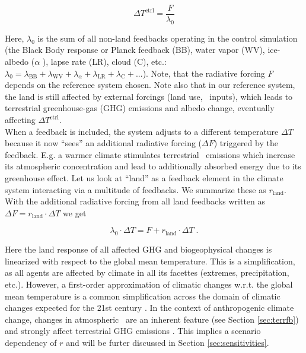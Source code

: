  \begin{equation}
   \Delta T^{\text{ctrl}} = \frac{F}{\lambda_0}
 \label{eqn:fb0}
 \end{equation}

Here, $\lambda_0$ is the sum of all non-land feedbacks operating in the control simulation (the Black Body response or Planck feedback (BB), water vapor (WV), ice-albedo ($\alpha$ ), lapse rate (LR), cloud (C), etc.: $\lambda_0 = \lambda_{\text{BB}} + \lambda_{\text{WV}} + \lambda_\alpha + \lambda_{\text{LR}} + \lambda_{\text{C}} + ... $). Note, that the radiative forcing $F$ depends on the reference system chosen. Note also that in our reference system, the land is still affected by external forcings (land use, \nr\ inputs), which leads to terrestrial greenhouse-gas (GHG) emissions and albedo change, eventually affecting $\Delta T^{\text{ctrl}}$.\\

 When a feedback is included, the system adjusts to a different temperature $\Delta T$ because it now ``sees'' an additional radiative forcing ($\Delta F$) triggered by the feedback. E.g. a warmer climate stimulates terrestrial \nno\ emissions which increase its atmospheric concentration and lead to additionally absorbed energy due to its greenhouse effect. Let us look at ``land'' as a feedback element in the climate system interacting via a multitude of feedbacks. We summarize these as $r_{\text{land}}$. With the additional radiative forcing from all land feedbacks written as $\Delta F = r_{\text{land}} \cdot \Delta T$ we get 

\begin{equation}
    \lambda_0 \cdot \Delta T = F + r_{\text{land}} \cdot \Delta T\;.
 \label{eqn:fb1}
 \end{equation}

Here the land response of all affected GHG and biogeophysical changes is linearized with respect to the global mean temperature. This is a simplification, as all agents are affected by climate in all its facettes (extremes, precipitation, etc.). However, a first-order approximation of climatic changes w.r.t. the global mean temperature is a common simplification across the domain of climatic changes expected for the 21st century \citep{hooss01cd}. In the context of anthropogenic climate change, changes in atmospheric \coo\ are an inherent feature (see Section \ref{sec:terrfb}) and strongly affect terrestrial GHG emissions \citep{vangroenigen11}. This implies a scenario dependency of $r$ and will be furter discussed in Section \ref{sec:sensitivities}.\\

